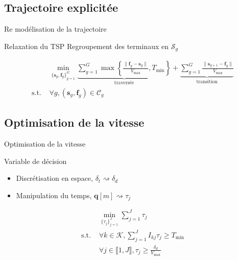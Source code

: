\subsection{Trajectoire explicitée}
\begin{frame}{Re modélisation de la trajectoire}
  \begin{block}{Relaxation du TSP}
    Regroupement des terminaux en \( \mathcal{S}_g \)
  \end{block}
  \begin{align}
    & \min_{
        {\{\mathbf{s}_g, \mathbf{f}_g\}}_{g=1}^G
      }
      \underbrace{
      \sum_{g = 1}^G \max \left\{
      \frac{
      \| \mathbf{f}_g - \mathbf{s}_g \|
      }{
      V_{\text{max}}
      }, T_{\text{min}}
      \right\}
      }_{\text{traversée}} +
      \underbrace{
      \sum_{g = 1}^G
      \frac{
      \| \mathbf{s}_{g + 1} - \mathbf{f}_g \|
      }{
      V_{\text{max}}
      }
      }_{\text{transition}} \tag{P4} \\
    \text{s.t. } & \forall g, (\mathbf{s}_g, \mathbf{f}_g) \in \mathcal{C}_g
  \end{align}
\end{frame}

\subsection{Optimisation de la vitesse}
\begin{frame}{Optimisation de la vitesse}
  \begin{block}{Variable de décision}
    \begin{itemize}
    \item Discrétisation en espace, \( \delta_t \rightsquigarrow
      \delta_d \)
    \item Manipulation du temps, \( \mathbf{q}[m] \rightsquigarrow
      \tau_j \)
    \end{itemize}
  \end{block}
  \begin{align}
    & \min_{\{\tau_j\}_{j = 1}^J} \sum_{j = 1}^J \tau_j \tag{P5} \\
    \text{s.t. } & \forall k \in \mathcal{K}, \sum_{j = 1}^J I_{kj}
                   \tau_j \geq T_{\text{min}} \\
    & \forall j \in \llbracket 1, J \rrbracket,
      \tau_j \geq \frac{\delta_d}{V_{\text{max}}}
  \end{align}
\end{frame}
